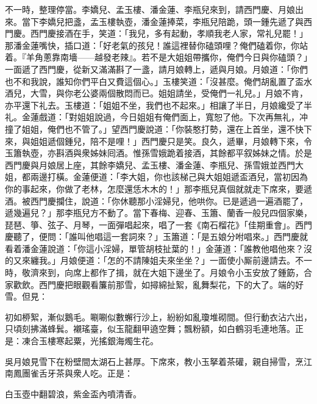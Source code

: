 不一時，整理停當。李嬌兒、孟玉樓、潘金蓮、李瓶兒來到，請西門慶、月娘出來。當下李嬌兒把盞，孟玉樓執壺，潘金蓮捧菜，李瓶兒陪跪，頭一鍾先遞了與西門慶。西門慶接酒在手，笑道：「我兒，多有起動，孝順我老人家，常礼兒罷！」那潘金蓮嘴快，插口道：「好老氣的孩兒！誰這裡替你磕頭哩？俺們磕着你，你站着。『羊角蔥靠南墻——越發老辣』。若不是大姐姐帶攜你，俺們今日與你磕頭？」一面遞了西門慶，從新又滿滿斟了一盞，請月娘轉上，遞與月娘。月娘道：「你們也不和我說，誰知你們平白又費這個心。」玉樓笑道：「沒甚麼。俺們胡亂置了盃水酒兒，大雪，與你老公婆兩個散悶而已。姐姐請坐，受俺們一礼兒。」月娘不肯，亦平還下礼去。玉樓道：「姐姐不坐，我們也不起來。」相讓了半日，月娘纔受了半礼。金蓮戲道：「對姐姐說過，今日姐姐有俺們面上，寬恕了他。下次再無礼，冲撞了姐姐，俺們也不管了。」{}望西門慶說道：「你裝憨打勢，還在上首坐，還不快下來，與姐姐遞個鍾兒，陪不是哩！」西門慶只是笑。良久，遞畢，月娘轉下來，令玉簫執壺，亦斟酒與衆姊妹囘酒。惟孫雪娥跪着接酒，其餘都平叙姊妹之情。於是西門慶與月娘居上座，其餘李嬌兒、孟玉樓、潘金蓮、李瓶兒、孫雪娥並西門大姐，都兩邊打橫。金蓮便道：「李大姐，你也該梯己與大姐姐遞盃酒兒，當初因為你的事起來，你做了老林，怎麼還恁木木的！」{}那李瓶兒真個就就走下席來，要遞酒。{}被西門慶攔住，說道：「你休聽那小淫婦兒，他哄你。{}已是遞過一遍酒罷了，遞幾遍兒？」那李瓶兒方不動了。當下春梅、迎春、玉簫、蘭香一般兒四個家樂，琵琶、箏、弦子、月琴，一面彈唱起來，唱了一套《南石榴花》「佳期重會」。{}西門慶聽了，便問：「誰叫他唱這一套詞來？」玉簫道：「是五娘分咐唱來。」西門慶就看着潘金蓮說道：{}「你這小淫婦，單管胡枝扯葉的！」金蓮道：「誰教他唱他來？沒的又來纏我。」月娘便道：「怎的不請陳姐夫來坐坐？」一面使小厮前邊請去。不一時，敬濟來到，向席上都作了揖，就在大姐下邊坐了。月娘令小玉安放了鍾筯，合家歡飲。西門慶把眼觀看簾前那雪，如撏綿扯絮，亂舞梨花，下的大了。端的好雪。但見：

初如桺絮，漸似鵝毛。唰唰似數蠏行沙上，紛紛如亂瓊堆砌間。但行動衣沾六出，只頃刻拂滿蜂鬂。襯瑤臺，似玉龍翻甲遶空舞；飄粉額，如白鶴羽毛連地落。正是：凍合玉樓寒起粟，光搖銀海燭生花。

吳月娘見雪下在粉壁間太湖石上甚厚。下席來，教小玉拏着茶礶，親自掃雪，烹江南鳳團雀舌牙茶與衆人吃。正是：

白玉壺中翻碧浪，紫金盃內噴清香。

